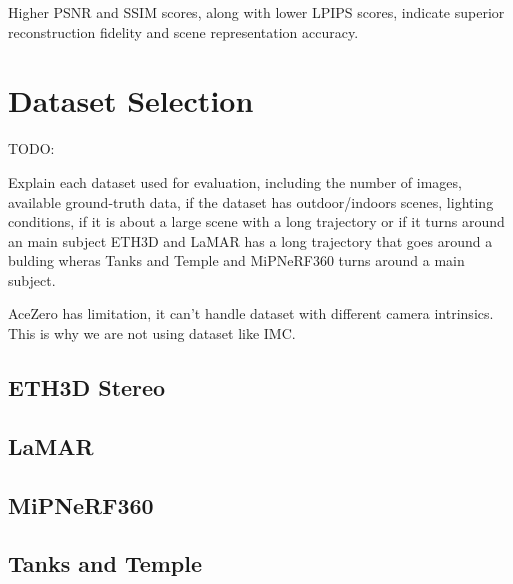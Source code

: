 Higher PSNR and SSIM scores, along with lower LPIPS scores, indicate superior reconstruction fidelity and scene representation accuracy.




\section{Dataset Selection}\label{sec:dataset-selection}

TODO: 

Explain each dataset used for evaluation, including the number of images, available ground-truth data, 
if the dataset has outdoor/indoors scenes, lighting conditions, if it is about a large scene with a long trajectory or if it turns around an main subject
ETH3D and LaMAR has a long trajectory that goes around a bulding wheras Tanks and Temple and MiPNeRF360 turns around a main subject.

AceZero has limitation, it can't handle dataset with different camera intrinsics. This is why we are not using dataset like IMC.


\subsection{ETH3D Stereo}


\subsection{LaMAR}


\subsection{MiPNeRF360}


\subsection{Tanks and Temple}